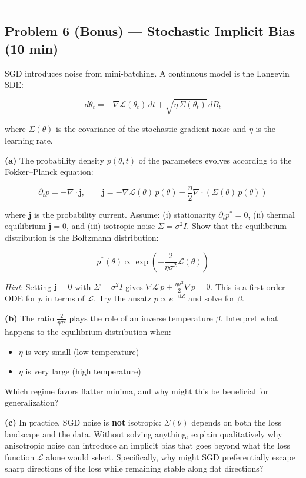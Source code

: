 \documentclass[
]{article}
\providecommand{\tightlist}{%
  \setlength{\itemsep}{0pt}\setlength{\parskip}{0pt}}
\begin{document}
\begin{center}\rule{0.5\linewidth}{0.5pt}\end{center}

\subsection{Problem 6 (Bonus) --- Stochastic Implicit Bias (10
min)}\label{problem-6-bonus-stochastic-implicit-bias-10-min}

SGD introduces noise from mini-batching. A continuous model is the Langevin SDE:

\[d\theta_t = -\nabla \mathcal{L}(\theta_t)\,dt + \sqrt{\eta\,\Sigma(\theta_t)}\,dB_t\]

where \(\Sigma(\theta)\) is the covariance of the stochastic gradient
noise and \(\eta\) is the learning rate.

\textbf{(a)} The probability density \(p(\theta, t)\) of the parameters
evolves according to the Fokker--Planck equation:

\[\partial_t p = -\nabla \cdot \mathbf{j}, \qquad \mathbf{j} = -\nabla \mathcal{L}(\theta)\,p(\theta) - \frac{\eta}{2}\nabla \cdot \left(\Sigma(\theta)\,p(\theta)\right)\]

where \(\mathbf{j}\) is the probability current. Assume: (i)
stationarity \(\partial_t p^* = 0\), (ii) thermal equilibrium
\(\mathbf{j} = 0\), and (iii) isotropic noise \(\Sigma = \sigma^2 I\).
Show that the equilibrium distribution is the Boltzmann distribution:

\[p^*(\theta) \propto \exp\left(-\frac{2}{\eta \sigma^2}\mathcal{L}(\theta)\right)\]

\emph{Hint}: Setting \(\mathbf{j} = 0\) with \(\Sigma = \sigma^2 I\)
gives \(\nabla \mathcal{L}\, p + \frac{\eta\sigma^2}{2}\nabla p = 0\).
This is a first-order ODE for \(p\) in terms of \(\mathcal{L}\). Try the
ansatz \(p \propto e^{-\beta \mathcal{L}}\) and solve for \(\beta\).

\textbf{(b)} The ratio \(\frac{2}{\eta \sigma^2}\) plays the role of an
inverse temperature \(\beta\). Interpret what happens to the equilibrium
distribution when:

\begin{itemize}
\tightlist
\item
  \(\eta\) is very small (low temperature)
\item
  \(\eta\) is very large (high temperature)
\end{itemize}

Which regime favors flatter minima, and why might this be beneficial for
generalization?

\textbf{(c)} In practice, SGD noise is \textbf{not} isotropic:
\(\Sigma(\theta)\) depends on both the loss landscape and the data.
Without solving anything, explain qualitatively why anisotropic noise
can introduce an implicit bias that goes beyond what the loss function
\(\mathcal{L}\) alone would select. Specifically, why might SGD
preferentially escape sharp directions of the loss while remaining
stable along flat directions?
\end{document}
